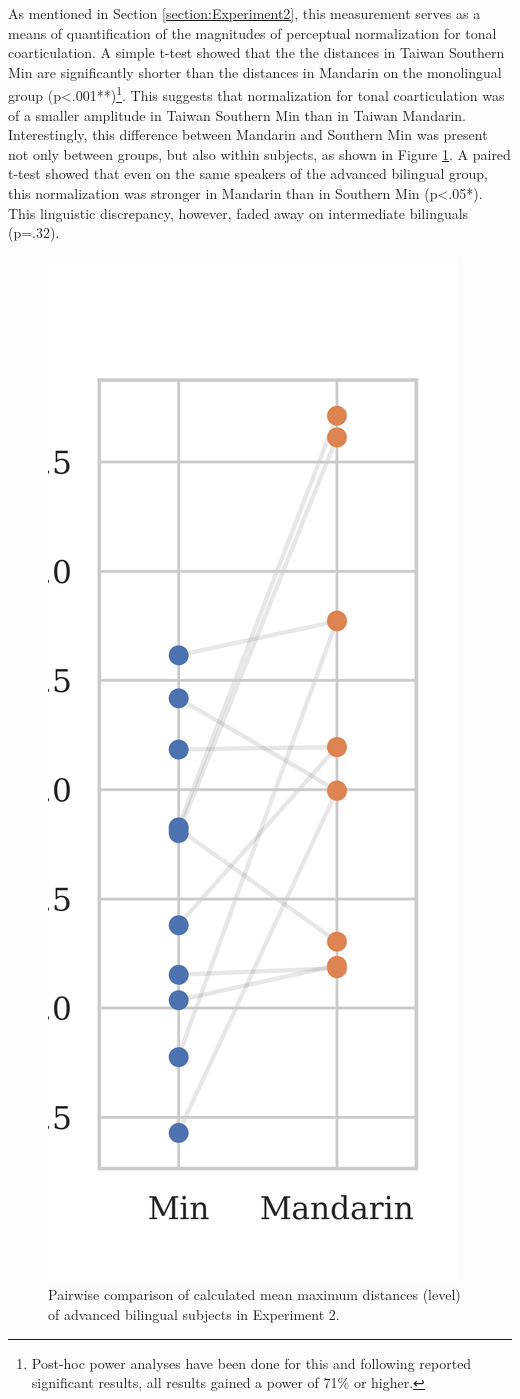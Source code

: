 \documentclass[12pt]{report}
\begin{document}
\begin{CJK}{UTF8}{bsmi}

As mentioned in Section \ref{section:Experiment2}, this measurement serves as a means of quantification of the magnitudes of perceptual normalization for tonal coarticulation. A simple t-test showed that the the distances in Taiwan Southern Min are significantly shorter than the distances in Mandarin on the monolingual group (p<.001**)\footnote{Post-hoc power analyses have been done for this and following reported significant results, all results gained a power of 71\% or higher.}. This suggests that normalization for tonal coarticulation was of a smaller amplitude in Taiwan Southern Min than in Taiwan Mandarin. Interestingly, this difference between Mandarin and Southern Min was present not only between groups, but also within subjects, as shown in Figure \ref{Figure:DistBilingualBoxPlot}. A paired t-test showed that even on the same speakers of the advanced bilingual group, this normalization was stronger in Mandarin than in Southern Min (p<.05*). This linguistic discrepancy, however, faded away on intermediate bilinguals (p=.32).

\begin{figure}[hbt!]
\centering
\includegraphics[width=.3\textwidth, trim={0 .5cm 0 0}]{Figures/E2/Result_bilingual.png}
\caption{Pairwise comparison of calculated mean maximum distances (level) of advanced bilingual subjects in Experiment 2.}
\label{Figure:DistBilingualBoxPlot}
\end{figure}


\end{CJK}
\end{document}
